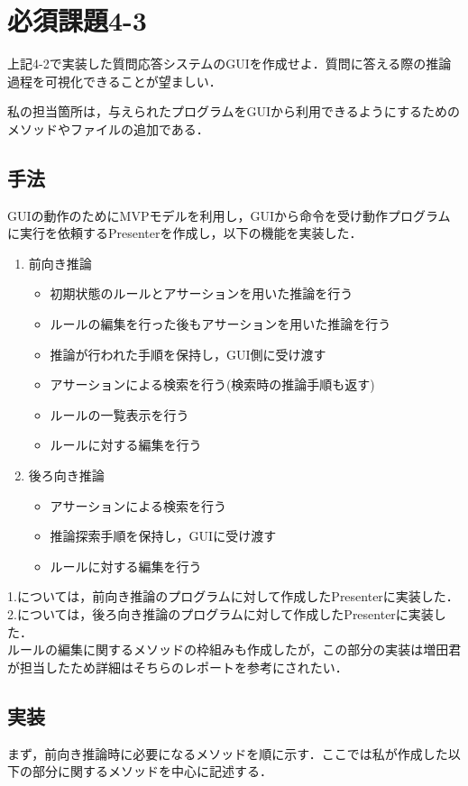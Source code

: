 \documentclass[12pt]{jarticle}
\begin{document}
\section{必須課題4-3}
\begin{screen}
  上記4-2で実装した質問応答システムのGUIを作成せよ．質問に答える際の推論過程を可視化できることが望ましい．
\end{screen}
私の担当箇所は，与えられたプログラムをGUIから利用できるようにするためのメソッドやファイルの追加である．
\subsection{手法}
GUIの動作のためにMVPモデルを利用し，GUIから命令を受け動作プログラムに実行を依頼するPresenterを作成し，以下の機能を実装した．

\begin{enumerate}
\item 前向き推論
	\begin{itemize}
	\item 初期状態のルールとアサーションを用いた推論を行う
	\item ルールの編集を行った後もアサーションを用いた推論を行う
	\item 推論が行われた手順を保持し，GUI側に受け渡す
	\item アサーションによる検索を行う(検索時の推論手順も返す)
	\item ルールの一覧表示を行う
	\item ルールに対する編集を行う
	\end{itemize}
\item 後ろ向き推論
	\begin{itemize}
	\item アサーションによる検索を行う
	\item 推論探索手順を保持し，GUIに受け渡す
	\item ルールに対する編集を行う
	\end{itemize}
\end{enumerate}

1.については，前向き推論のプログラムに対して作成したPresenterに実装した．\\

2.については，後ろ向き推論のプログラムに対して作成したPresenterに実装した．\\

ルールの編集に関するメソッドの枠組みも作成したが，この部分の実装は増田君が担当したため詳細はそちらのレポートを参考にされたい．

\subsection{実装}
まず，前向き推論時に必要になるメソッドを順に示す．ここでは私が作成した以下の部分に関するメソッドを中心に記述する．
\end{document}
